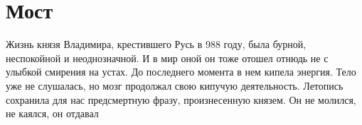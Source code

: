  
 
 
 
 
\chapter{Мост}
\label{sec:slova.most}

Жизнь князя Владимира, крестившего Русь в 988 году, была бурной, неспокойной и
неоднозначной. И в мир оной он тоже отошел отнюдь не с улыбкой смирения на
устах. До последнего момента в нем кипела энергия. Тело уже не слушалась, но
мозг продолжал свою кипучую деятельность.  Летопись сохранила для нас
предсмертную фразу, произнесенную князем. Он не молился, не каялся, он отдавал
